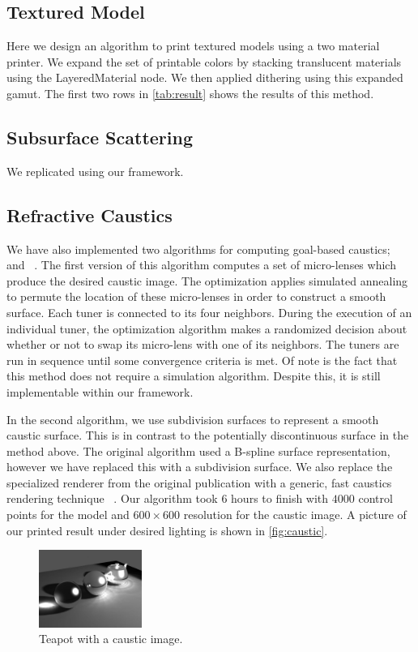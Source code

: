\documentclass[annual]{acmsiggraph}
\begin{document}
\subsection{Textured Model}
Here we design an algorithm to print textured models using a two material printer. We expand the set of printable colors by stacking translucent materials using the LayeredMaterial node. We then applied dithering using this expanded gamut.
The first two rows in \autoref{tab:result} shows the results of this method.
\subsection{Subsurface Scattering}
We replicated \cite{Hasan:2010} using our framework.

\subsection{Refractive Caustics}
We have also implemented two algorithms for computing goal-based caustics;  ~\cite{Marios:2011} and ~\cite{Finckh:2010}.
The first version of this algorithm computes  a set of micro-lenses which produce the desired caustic image.
The optimization applies simulated annealing to permute the location of these micro-lenses in order to construct a smooth surface.
Each tuner is connected to its four neighbors.
During the execution of an individual tuner, the optimization algorithm makes a randomized decision about
 whether or not to swap its micro-lens with one of its neighbors.
The tuners are run in sequence until some convergence criteria is met.
Of note is the fact that this method does not require a simulation algorithm.
Despite this, it is still implementable within our framework.

In the second algorithm, we use subdivision surfaces to represent a smooth caustic surface.
This is in contrast to the potentially discontinuous surface in the method above.
The original algorithm used a B-spline surface representation, however we have replaced this with a subdivision surface.
We also replace the specialized renderer from the original publication with a generic, fast caustics rendering technique ~\cite{Yuksel:2009}. Our algorithm took 6 hours to finish with $4000$ control points for the model and $600\times 600$ resolution for the caustic image.  A picture of our printed result under desired lighting is shown in \autoref{fig:caustic}.
\begin{figure}
	\centering
 	\includegraphics[width=0.3\textwidth]{figure/caustic.jpg}
\caption{Teapot with a caustic image.}
\label{fig:caustic}
\end{figure}
\end{document}
